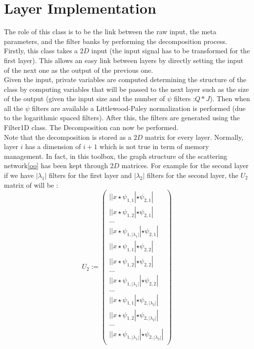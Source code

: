 \documentclass[a4paper]{report}
\begin{document}
\section{Layer Implementation}\label{ll}
The role of this class is to be the link between the raw input, the meta parameters, and the filter banks by performing the decomposition process. Firstly, this class takes a $2D$ input (the input signal has to be transformed for the first layer). This allows an easy link between layers by directly setting the input of the next one as the output of the previous one. 
\\
Given the input, private variables are computed determining the structure of the class by computing variables that will be passed to the next layer such as the size of the output (given the input size and the number of $\psi$ filters :$Q*J$). Then when all the $\psi$ filters are available a Littlewood-Paley normalization is performed (due to the logarithmic spaced filters). After this, the filters are generated using the Filter1D class. The Decomposition can now be performed.
\\
Note that the decomposition is stored as a $2D$ matrix for every layer. Normally, layer $i$ has a dimension of $i+1$ which is not true in term of memory management. In fact, in this toolbox, the graph structure of the scattering network\ref{oo} has been kept through $2D$ matrices. For example for the second layer if we have $|\lambda_1|$ filters for the first layer and $|\lambda_2|$ filters for the second layer, the $U_2$ matrix of will be :
\[ U_2:= \left( \begin{array}{c}
||x \star \psi_{1,1}|\star \psi_{2,1}|\\
||x \star \psi_{1,2}|\star \psi_{2,1}|\\
\dots \\
||x \star \psi_{1,|\lambda_1|}|\star \psi_{2,1}|\\
||x \star \psi_{1,1}|\star \psi_{2,2}|\\
||x \star \psi_{1,2}|\star \psi_{2,2}|\\
\dots \\
||x \star \psi_{1,|\lambda_1|}|\star \psi_{2,2}|\\
\dots \\
||x \star \psi_{1,1}|\star \psi_{2,|\lambda_2|}|\\
||x \star \psi_{1,2}|\star \psi_{2,|\lambda_2|}|\\
\dots \\
||x \star \psi_{1,|\lambda_1|}|\star \psi_{2,|\lambda_2|}|\\
\end{array} \right)\]
\end{document}
